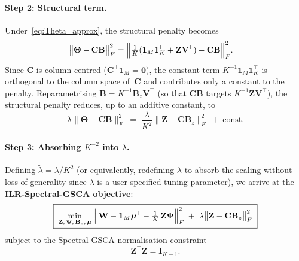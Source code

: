\paragraph{Step 2: Structural term.}
Under~\eqref{eq:Theta_approx}, the structural penalty becomes
\begin{align}
  \bigl\|\boldsymbol{\Theta} - \mathbf{C}\mathbf{B}\bigr\|_F^2
  &= \Bigl\|
    \tfrac{1}{K}(\mathbf{1}_M\mathbf{1}_K^{\!\top}
    + \mathbf{Z}\mathbf{V}^{\!\top})
    - \mathbf{C}\mathbf{B}
  \Bigr\|_F^2.
  \label{eq:structural_expanded}
\end{align}
Since $\mathbf{C}$ is column-centred ($\mathbf{C}^{\!\top}\mathbf{1}_M
= \mathbf{0}$), the constant term
$K^{-1}\mathbf{1}_M\mathbf{1}_K^{\!\top}$ is orthogonal to the column
space of~$\mathbf{C}$ and contributes only a constant to the penalty.
Reparametrising
$\mathbf{B} = K^{-1}\mathbf{B}_z\mathbf{V}^{\!\top}$ (so that
$\mathbf{C}\mathbf{B}$ targets $K^{-1}\mathbf{Z}\mathbf{V}^{\!\top}$),
the structural penalty reduces, up to an additive constant, to
\begin{equation}
  \lambda\bigl\|\boldsymbol{\Theta}
    - \mathbf{C}\mathbf{B}\bigr\|_F^2
  \;=\;
  \frac{\lambda}{K^2}
  \bigl\|\mathbf{Z} - \mathbf{C}\mathbf{B}_z\bigr\|_F^2
  \;+\;\text{const.}
  \label{eq:structural_ilr}
\end{equation}

\paragraph{Step 3: Absorbing $K^{-2}$ into $\lambda$.}
Defining $\tilde{\lambda}=\lambda/K^2$ (or equivalently, redefining
$\lambda$ to absorb the scaling without loss of generality since
$\lambda$ is a user-specified tuning parameter), we arrive at the
\textbf{ILR-Spectral-GSCA objective}:
%
\begin{equation}
  \boxed{\;
  \min_{\mathbf{Z},\,\boldsymbol{\Psi},\,\mathbf{B}_z,\,\boldsymbol{\mu}}\;
  \Bigl\|
    \mathbf{W}
    - \mathbf{1}_M\boldsymbol{\mu}^{\!\top}
    - \tfrac{1}{K}\,\mathbf{Z}\boldsymbol{\Psi}
  \Bigr\|_F^2
  \;+\;
  \lambda
  \bigl\|\mathbf{Z} - \mathbf{C}\mathbf{B}_z\bigr\|_F^2
  \;}
  \label{eq:objective}
\end{equation}
%
subject to the Spectral-GSCA normalisation constraint
\begin{equation}
  \mathbf{Z}^{\!\top}\mathbf{Z} = \mathbf{I}_{K-1}.
  \label{eq:constraint}
\end{equation}

